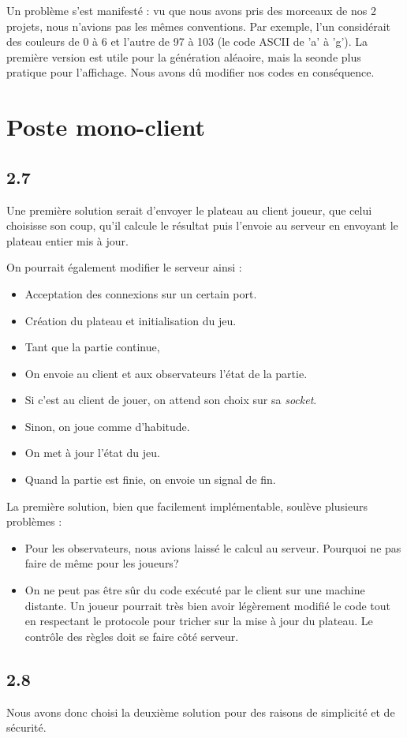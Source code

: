 \documentclass[12pt]{article}
\def\question#1{\subsection{#1}}
\def\sec#1{\section{#1}}
\begin{document}
Un problème s'est manifesté : vu que nous avons pris des morceaux de nos 2 projets, nous n'avions pas les mêmes conventions. Par exemple, l'un considérait des couleurs de 0 à 6 et l'autre de 97 à 103 (le code ASCII de 'a' à 'g'). La première version est utile pour la génération aléaoire, mais la seonde plus pratique pour l'affichage. Nous avons dû modifier nos codes en conséquence.



\sec{Poste mono-client}
\question{2.7}
Une première solution serait d'envoyer le plateau au client joueur, que celui choisisse son coup, qu'il calcule le résultat puis l'envoie au serveur en envoyant le plateau entier mis à jour.


On pourrait également modifier le serveur ainsi :
\begin{itemize}
  \item Acceptation des connexions sur un certain port.
  \item Création du plateau et initialisation du jeu.
  \item Tant que la partie continue,
  \item On envoie au client et aux observateurs l'état de la partie.
  \item Si c'est au client de jouer, on attend son choix sur sa \textit{socket}.
  \item Sinon, on joue comme d'habitude.
  \item On met à jour l'état du jeu.
  \item Quand la partie est finie, on envoie un signal de fin.
\end{itemize}


La première solution, bien que facilement implémentable, soulève plusieurs problèmes :
\begin{itemize}
\item Pour les observateurs, nous avions laissé le calcul au serveur. Pourquoi ne pas faire de même pour les joueurs?
\item On ne peut pas être sûr du code exécuté par le client sur une machine distante. Un joueur pourrait très bien avoir légèrement modifié le code tout en respectant le protocole pour tricher sur la mise à jour du plateau. Le contrôle des règles doit se faire côté serveur.
\end{itemize}



\question{2.8}
Nous avons donc choisi la deuxième solution pour des raisons de simplicité et de sécurité.
\end{document}
